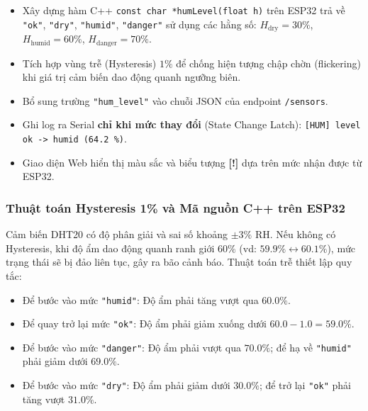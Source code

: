 \begin{tcolorbox}[
    enhanced, colback=black!2, colframe=black!60, boxrule=1pt, arc=2.5mm, drop shadow,
    attach boxed title to top left={xshift=4mm, yshift=-3mm},
    boxed title style={enhanced, colback=black!85, colframe=black!85, boxrule=1pt, arc=2.5mm, drop shadow, left=6pt, right=6pt, top=2pt, bottom=2pt},
    title=\textcolor{white}{\large\textbf{Yêu cầu kỹ thuật Bài tập 3}}
]
\bfseries
\vspace{0.2cm}
\begin{itemize}
    \item Xây dựng hàm C++ \texttt{const char *humLevel(float h)} trên ESP32 trả về \texttt{"ok"}, \texttt{"dry"}, \texttt{"humid"}, \texttt{"danger"} sử dụng các hằng số: $H_{\text{dry}} = 30\%$, $H_{\text{humid}} = 60\%$, $H_{\text{danger}} = 70\%$.
    \item Tích hợp vùng trễ (Hysteresis) $1\%$ để chống hiện tượng chập chờn (flickering) khi giá trị cảm biến dao động quanh ngưỡng biên.
    \item Bổ sung trường \texttt{"hum\_level"} vào chuỗi JSON của endpoint \texttt{/sensors}.
    \item Ghi log ra Serial \textbf{chỉ khi mức thay đổi} (State Change Latch): \texttt{[HUM] level ok -> humid (64.2 \%)}.
    \item Giao diện Web hiển thị màu sắc và biểu tượng \textbf{[!]} dựa trên mức nhận được từ ESP32.
\end{itemize}
\end{tcolorbox}

\subsubsection{Thuật toán Hysteresis 1\% và Mã nguồn C++ trên ESP32}
Cảm biến DHT20 có độ phân giải và sai số khoảng $\pm 3\%$ RH. Nếu không có Hysteresis, khi độ ẩm dao động quanh ranh giới $60\%$ (vd: $59.9\% \leftrightarrow 60.1\%$), mức trạng thái sẽ bị đảo liên tục, gây ra bão cảnh báo. Thuật toán trễ thiết lập quy tắc:
\begin{itemize}
    \item Để bước vào mức \texttt{"humid"}: Độ ẩm phải tăng vượt qua $60.0\%$.
    \item Để quay trở lại mức \texttt{"ok"}: Độ ẩm phải giảm xuống dưới $60.0 - 1.0 = 59.0\%$.
    \item Để bước vào mức \texttt{"danger"}: Độ ẩm phải vượt qua $70.0\%$; để hạ về \texttt{"humid"} phải giảm dưới $69.0\%$.
    \item Để bước vào mức \texttt{"dry"}: Độ ẩm phải giảm dưới $30.0\%$; để trở lại \texttt{"ok"} phải tăng vượt $31.0\%$.
\end{itemize}

